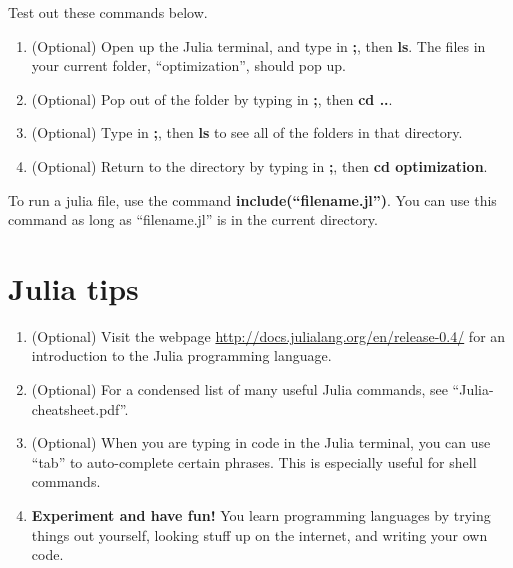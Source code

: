 \documentclass[12pt]{article}
\begin{document}
Test out these commands below.  

\begin{enumerate}

\item (Optional) Open up the Julia terminal, and type in {\bf ;}, then {\bf ls}.  The files in your current folder, ``optimization'', should pop up.  

\item (Optional) Pop out of the folder by typing in {\bf ;}, then {\bf cd ..}.  

\item (Optional) Type in {\bf ;}, then {\bf ls} to see all of the folders in that directory.  

\item (Optional) Return to the directory by typing in {\bf ;}, then {\bf cd optimization}.

\end{enumerate}

To run a julia file, use the command {\bf include(``filename.jl'')}.  You can use this command as long as ``filename.jl'' is in the current
directory.  

\section{Julia tips}

\begin{enumerate}

\item (Optional) Visit the webpage \url{http://docs.julialang.org/en/release-0.4/} for an introduction to the Julia programming language.  

\item (Optional) For a condensed list of many useful Julia commands, see ``Julia-cheatsheet.pdf''.  

\item (Optional) When you are typing in code in the Julia terminal, you can use ``tab'' to auto-complete certain phrases.  This is especially useful for shell commands.  

\item {\bf Experiment and have fun!}  You learn programming languages by trying things out yourself, looking stuff up on the internet, and writing your own code.  
\end{enumerate}
\end{document}
